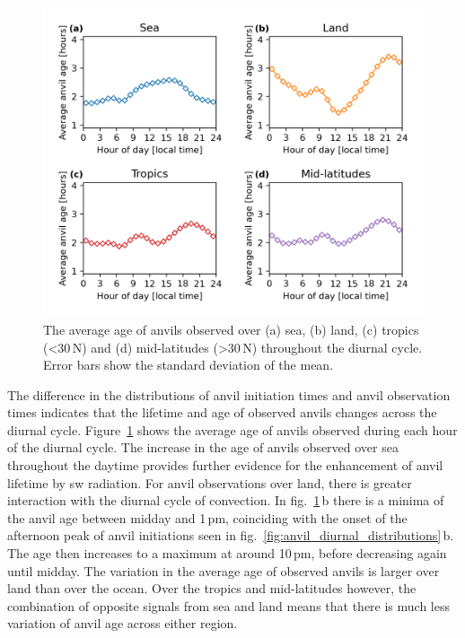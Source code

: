 \begin{figure}[tp]
    \centering
    \includegraphics[width=\textwidth]{figures/chapter2_27.png}
    \caption[
    The average age of anvils observed over sea, land, tropics and mid-latitudes throughout the diurnal cycle.
    ]{
    The average age of anvils observed over (a) sea, (b) land, (c) tropics (\textless 30\,\textdegree N) and (d) mid-latitudes (\textgreater 30\,\textdegree N) throughout the diurnal cycle. Error bars show the standard deviation of the mean.
    }
    \label{fig:anvil_diurnal_age}
\end{figure}

The difference in the distributions of anvil initiation times and anvil observation times indicates that the lifetime and age of observed anvils changes across the diurnal cycle.
Figure~\ref{fig:anvil_diurnal_age} shows the average age of anvils observed during each hour of the diurnal cycle.
The increase in the age of anvils observed over sea throughout the daytime provides further evidence for the enhancement of anvil lifetime by \acrshort{sw} radiation.
For anvil observations over land, there is greater interaction with the diurnal cycle of convection.
In fig.~\ref{fig:anvil_diurnal_age}\,b there is a minima of the anvil age between midday and 1\,pm, coinciding with the onset of the afternoon peak of anvil initiations seen in fig.~\ref{fig:anvil_diurnal_distributions}\,b.
The age then increases to a maximum at around 10\,pm, before decreasing again until midday.
The variation in the average age of observed anvils is larger over land than over the ocean.
Over the tropics and mid-latitudes however, the combination of opposite signals from sea and land means that there is much less variation of anvil age across either region.


